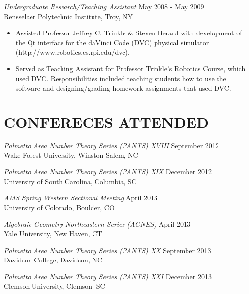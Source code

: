\documentclass[line,margin]{res}
\begin{document}
\begin{resume}
                  {\sl Undergraduate Research/Teaching Assistant} \hfill May 2008 - May 2009 \\
                  Rensselaer Polytechnic Institute, Troy, NY\\
                  \begin{itemize}  \itemsep -2pt %
                  \item Assisted Professor Jeffrey C. Trinkle \& Steven Berard with development of the Qt interface for the daVinci Code (DVC) physical simulator\\ (http://www.robotics.cs.rpi.edu/dvc).
                  \item Served as Teaching Assistant for Professor Trinkle's Robotics Course, which used DVC.
                    Responsibilities included teaching students how to use the software and designing/grading homework assignments that used DVC.
                  \end{itemize}

                  \section{CONFERECES ATTENDED}
                          {\sl Palmetto Area Number Theory Series (PANTS) XVIII} \hfill September 2012\\
                          Wake Forest University, Winston-Salem, NC
                          
                          {\sl Palmetto Area Number Theory Series (PANTS) XIX} \hfill December 2012\\
                          University of South Carolina, Columbia, SC

                          {\sl AMS Spring Western Sectional Meeting} \hfill April 2013\\
                          University of Colorado, Boulder, CO
                          
                          {\sl Algebraic Geometry Northeastern Series (AGNES)} \hfill April 2013\\
                          Yale University, New Haven, CT

                          {\sl Palmetto Area Number Theory Series (PANTS) XX} \hfill September 2013\\
                          Davidson College, Davidson, NC
                          
                          {\sl Palmetto Area Number Theory Series (PANTS) XXI} \hfill December 2013\\
                          Clemson University, Clemson, SC
                          

\end{resume}
\end{document}
